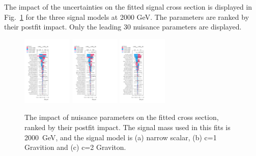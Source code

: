 The impact of the uncertainties on the fitted signal cross section is displayed in Fig.~\ref{fig:ranking2000} for the three signal models at 2000 GeV. The parameters are ranked by their postfit impact. Only the leading 30 nuisance parameters are displayed.

\begin{figure}[htbp!]
\begin{center}
\includegraphics[width=0.21\textwidth]{figures/boosted/results/ranking_okt18_s_2000.pdf} 
\includegraphics[width=0.21\textwidth]{figures/boosted/results/ranking_okt18_g10_2000.pdf} 
\includegraphics[width=0.21\textwidth]{figures/boosted/results/ranking_okt18_g20_2000.pdf} 
\caption{The impact of nuisance parameters on the fitted cross section, ranked by their postfit impact. The signal mass used in this fits is 2000~GeV, and the signal model is (a) narrow scalar, (b) c=1 Gravition and (c) c=2 Graviton.}
\label{fig:ranking2000}
\end{center}
\end{figure}


